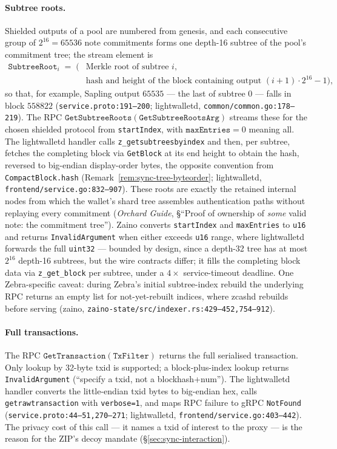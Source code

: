 \documentclass[11pt,a4paper]{article}
\theoremstyle{definition}
\begin{document}
\paragraph{Subtree roots.} Shielded outputs of a pool are numbered from
genesis, and each consecutive group of $2^{16} = 65536$ note commitments
forms one depth-16 subtree of the pool's commitment tree; the stream
element is
\begin{align*}
\mathtt{SubtreeRoot}_i \;=\; \bigl(&\text{Merkle root of subtree } i,\\
&\text{hash and height of the block containing output }
(i+1)\cdot 2^{16} - 1\bigr),
\end{align*}
so that, for example, Sapling output $65535$ --- the last of subtree $0$
--- falls in block $558822$ (\texttt{service.proto:191--200};
\textsf{lightwalletd}, \texttt{common/common.go:178--219}). The RPC
$\mathtt{GetSubtreeRoots}(\mathtt{GetSubtreeRootsArg})$ streams these for
the chosen shielded protocol from \texttt{startIndex}, with
$\mathtt{maxEntries} = 0$ meaning all. The lightwalletd handler calls
\texttt{z\_getsubtreesbyindex} and then, per subtree, fetches the
completing block via \texttt{GetBlock} at its end height to obtain the
hash, reversed to big-endian display-order bytes, the opposite
convention from \texttt{CompactBlock.hash}
(Remark~\ref{rem:sync-tree-byteorder}; \textsf{lightwalletd},
\texttt{frontend/service.go:832--907}). These roots are exactly the
retained internal nodes from which the wallet's shard tree assembles
authentication paths without replaying every commitment (\emph{Orchard
Guide}, \S``Proof of ownership of \emph{some} valid note: the commitment
tree''). Zaino converts \texttt{startIndex} and \texttt{maxEntries} to
\texttt{u16} and returns \texttt{InvalidArgument} when either exceeds
\texttt{u16} range, where lightwalletd forwards the full \texttt{uint32}
--- bounded by design, since a depth-32 tree has at most $2^{16}$
depth-16 subtrees, but the wire contracts differ; it fills the completing
block data via \texttt{z\_get\_block} per subtree, under a $4 \times$
service-timeout deadline. One Zebra-specific caveat: during Zebra's
initial subtree-index rebuild the underlying RPC returns an empty list
for not-yet-rebuilt indices, where zcashd rebuilds before serving
(\textsf{zaino}, \texttt{zaino-state/src/indexer.rs:429--452,754--912}).

\paragraph{Full transactions.} The RPC
$\mathtt{GetTransaction}(\mathtt{TxFilter})$ returns the full serialised
transaction. Only lookup by 32-byte txid is supported; a block-plus-index
lookup returns \texttt{InvalidArgument} (``specify a txid, not a
blockhash+num''). The lightwalletd handler converts the little-endian
txid bytes to big-endian hex, calls \texttt{getrawtransaction} with
\texttt{verbose=1}, and maps RPC failure to gRPC \texttt{NotFound}
(\texttt{service.proto:44--51,270--271}; \textsf{lightwalletd},
\texttt{frontend/service.go:403--442}). The privacy cost of this call ---
it names a txid of interest to the proxy --- is the reason for the ZIP's
decoy mandate (\S\ref{sec:sync-interaction}).
\end{document}
